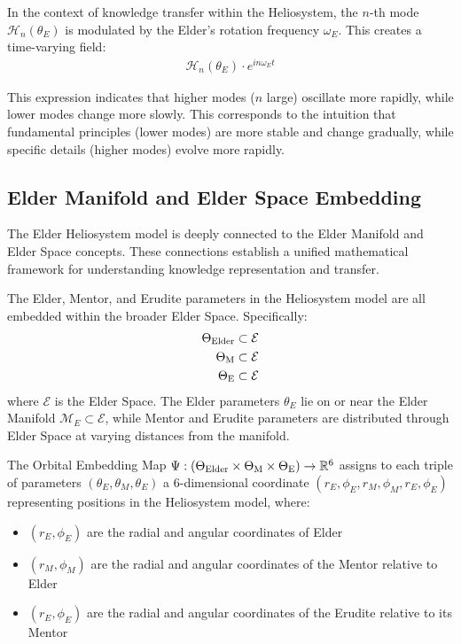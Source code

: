 In the context of knowledge transfer within the Heliosystem, the $n$-th mode $\mathcal{H}_n(\theta_E)$ is modulated by the Elder's rotation frequency $\omega_E$. This creates a time-varying field:
\begin{align}
\mathcal{H}_n(\theta_E) \cdot e^{in\omega_E t}
\end{align}

This expression indicates that higher modes ($n$ large) oscillate more rapidly, while lower modes change more slowly. This corresponds to the intuition that fundamental principles (lower modes) are more stable and change gradually, while specific details (higher modes) evolve more rapidly.

\subsection{Elder Manifold and Elder Space Embedding}

The Elder Heliosystem model is deeply connected to the Elder Manifold and Elder Space concepts. These connections establish a unified mathematical framework for understanding knowledge representation and transfer.

\begin{theorem}
The Elder, Mentor, and Erudite parameters in the Heliosystem model are all embedded within the broader Elder Space. Specifically:
\begin{align}
\Theta_{\text{Elder}} &\subset \mathcal{E}\\
\Theta_{\text{M}} &\subset \mathcal{E}\\
\Theta_{\text{E}} &\subset \mathcal{E}
\end{align}
where $\mathcal{E}$ is the Elder Space. The Elder parameters $\theta_E$ lie on or near the Elder Manifold $\mathcal{M}_E \subset \mathcal{E}$, while Mentor and Erudite parameters are distributed through Elder Space at varying distances from the manifold.
\end{theorem}

\begin{definition}
The Orbital Embedding Map $\Psi: (\Theta_{\text{Elder}} \times \Theta_{\text{M}} \times \Theta_{\text{E}}) \rightarrow \mathbb{R}^6$ assigns to each triple of parameters $(\theta_E, \theta_M, \theta_E)$ a 6-dimensional coordinate $(r_E, \phi_E, r_M, \phi_M, r_{E}, \phi_{E})$ representing positions in the Heliosystem model, where:
\begin{itemize}
    \item $(r_E, \phi_E)$ are the radial and angular coordinates of Elder
    \item $(r_M, \phi_M)$ are the radial and angular coordinates of the Mentor relative to Elder
    \item $(r_{E}, \phi_{E})$ are the radial and angular coordinates of the Erudite relative to its Mentor
\end{itemize}
\end{definition}

